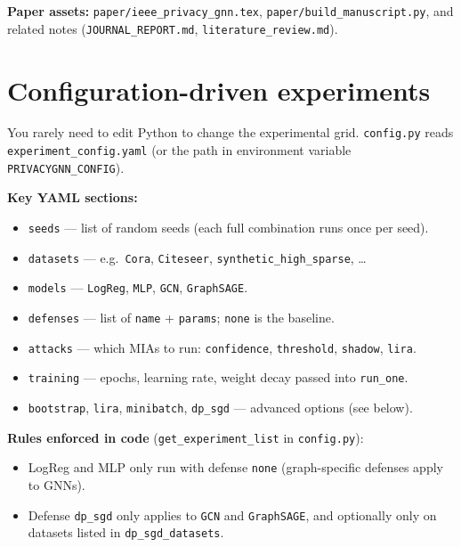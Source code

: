 \documentclass[11pt,a4paper]{article}
\begin{document}
\noindent\textbf{Paper assets:} \texttt{paper/ieee\_privacy\_gnn.tex}, \texttt{paper/build\_manuscript.py}, and related notes (\texttt{JOURNAL\_REPORT.md}, \texttt{literature\_review.md}).

\section{Configuration-driven experiments}

You rarely need to edit Python to change the experimental grid. \texttt{config.py} reads \texttt{experiment\_config.yaml} (or the path in environment variable \texttt{PRIVACYGNN\_CONFIG}).

\textbf{Key YAML sections:}
\begin{itemize}
  \item \texttt{seeds} --- list of random seeds (each full combination runs once per seed).
  \item \texttt{datasets} --- e.g.\ \texttt{Cora}, \texttt{Citeseer}, \texttt{synthetic\_high\_sparse}, \ldots
  \item \texttt{models} --- \texttt{LogReg}, \texttt{MLP}, \texttt{GCN}, \texttt{GraphSAGE}.
  \item \texttt{defenses} --- list of \texttt{name} + \texttt{params}; \texttt{none} is the baseline.
  \item \texttt{attacks} --- which MIAs to run: \texttt{confidence}, \texttt{threshold}, \texttt{shadow}, \texttt{lira}.
  \item \texttt{training} --- epochs, learning rate, weight decay passed into \texttt{run\_one}.
  \item \texttt{bootstrap}, \texttt{lira}, \texttt{minibatch}, \texttt{dp\_sgd} --- advanced options (see below).
\end{itemize}

\textbf{Rules enforced in code} (\texttt{get\_experiment\_list} in \texttt{config.py}):
\begin{itemize}
  \item LogReg and MLP only run with defense \texttt{none} (graph-specific defenses apply to GNNs).
  \item Defense \texttt{dp\_sgd} only applies to \texttt{GCN} and \texttt{GraphSAGE}, and optionally only on datasets listed in \texttt{dp\_sgd\_datasets}.
\end{itemize}
\end{document}
